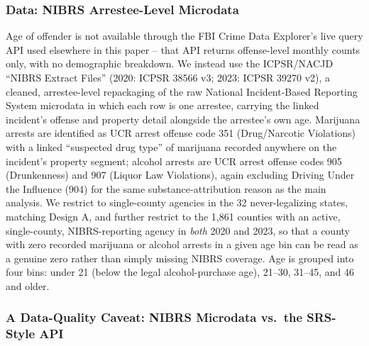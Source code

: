 \documentclass[11pt]{article}
\begin{document}
\subsubsection{Data: NIBRS Arrestee-Level Microdata}

Age of offender is not available through the FBI Crime Data Explorer's
live query API used elsewhere in this paper -- that API returns
offense-level monthly counts only, with no demographic breakdown. We
instead use the ICPSR/NACJD ``NIBRS Extract Files'' (2020: ICPSR 38566
v3; 2023: ICPSR 39270 v2), a cleaned, arrestee-level repackaging of the
raw National Incident-Based Reporting System microdata in which each
row is one arrestee, carrying the linked incident's offense and
property detail alongside the arrestee's own age. Marijuana arrests
are identified as UCR arrest offense code 351 (Drug/Narcotic
Violations) with a linked ``suspected drug type'' of marijuana
recorded anywhere on the incident's property segment; alcohol arrests
are UCR arrest offense codes 905 (Drunkenness) and 907 (Liquor Law
Violations), again excluding Driving Under the Influence (904) for the
same substance-attribution reason as the main analysis. We restrict to
single-county agencies in the 32 never-legalizing states, matching
Design A, and further restrict to the 1,861 counties with an active,
single-county, NIBRS-reporting agency in \emph{both} 2020 and 2023, so
that a county with zero recorded marijuana or alcohol arrests in a
given age bin can be read as a genuine zero rather than simply missing
NIBRS coverage. Age is grouped into four bins: under 21 (below the
legal alcohol-purchase age), 21--30, 31--45, and 46 and older.

\subsubsection{A Data-Quality Caveat: NIBRS Microdata vs.\ the SRS-Style API}
\end{document}
